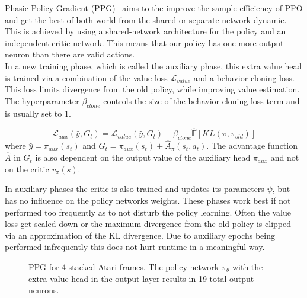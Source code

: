 \documentclass{article}
\begin{document}
Phasic Policy Gradient (PPG)~\cite{DBLP:journals/corr/abs-2009-04416} aims to the improve the
sample efficiency of PPO and get the best of both world from the shared-or-separate network
dynamic. This is achieved by using a shared-network architecture for the policy and an independent
critic network. This means that our policy has one more output neuron than there are valid actions.\\
In a new training phase, which is called the auxiliary phase, this extra value head is trained via
a combination of the value loss $\mathcal{L}_{value}$ and a behavior cloning loss. This loss limits divergence from the
old policy, while improving value estimation. The hyperparameter $\beta_{clone}$ controls
the size of the behavior cloning loss term and is usually set to 1.

\begin{equation}
    \mathcal{L}_{aux}(\hat y, G_t) = \mathcal{L}_{value}(\hat y, G_t) + \beta_{clone}\hat{\mathbb{E}}[KL(\pi, \pi_{old})]
\end{equation}
where $\hat y = \pi_{aux}(s_t)$ and $G_t = \pi_{aux}(s_t) + \hat A_\pi(s_t,a_t)$. The advantage function $\hat A$ in
$G_t$ is also dependent on the output value of the auxiliary head $\pi_{aux}$ and not on the critic $v_\pi(s)$.

\noindent In auxiliary phases the critic is also trained and updates its parameters $\psi$, but has no influence on the policy networks weights.
These phases work best if not performed too frequently as to not disturb
the policy learning. Often the value loss get scaled down or the maximum divergence from
the old policy is clipped via an approximation of the KL divergence. Due to auxiliary epochs being performed
infrequently this does not hurt runtime in a meaningful way.

\begin{figure}[htbp]
  \centering
  
  \caption{PPG for 4 stacked Atari frames. The policy network $\pi_\theta$ with the extra value head in the output layer results in 19 total
  output neurons.}
\end{figure}

\newpage
{}

$$$$
\end{document}
